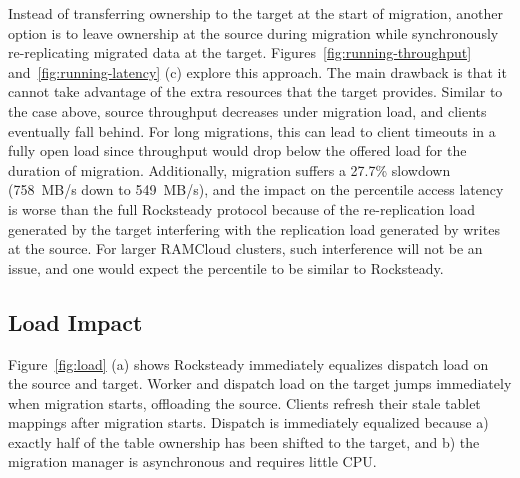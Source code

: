 Instead of transferring ownership to the target at the start of migration,
another option is to leave ownership at the source during migration
while synchronously re-replicating migrated data at the target.
Figures~\ref{fig:running-throughput} and~\ref{fig:running-latency} (c) explore
this approach. The main drawback is that it cannot take advantage of the
extra resources that the target provides. Similar to the
case above, source throughput decreases under migration load, and clients
eventually fall behind.  For long migrations, this can lead to client timeouts
in a fully open load since throughput would drop below the offered load
for the duration of migration.
Additionally, migration suffers a 27.7\% slowdown
(758~MB/s down to 549~MB/s), and the impact on the \nnnth
percentile access latency is worse than the full Rocksteady protocol
because of the re-replication load generated by the target interfering
with the replication load generated by writes at the source. For larger
RAMCloud clusters, such interference will not be an issue, and one would
expect the \nnnth percentile to be similar to Rocksteady.

\subsection{Load Impact}
\label{sec:eval-load}

Figure~\ref{fig:load} (a) shows Rocksteady immediately equalizes
dispatch load on the source and target. Worker and dispatch load on the
target jumps immediately when migration starts, offloading the source.
Clients refresh their stale tablet mappings after migration starts.
Dispatch is immediately equalized because
a) exactly half of the table ownership has been shifted to the target, and
b) the migration manager is asynchronous and requires little CPU.



%

